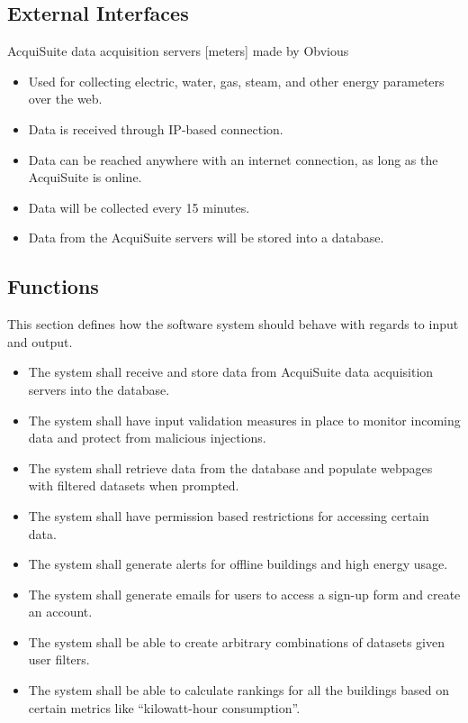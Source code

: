 \documentclass[onecolumn, draftclsnofoot,10pt, compsoc]{IEEEtran}
\begin{document}
    \subsection{External Interfaces}
    AcquiSuite data acquisition servers [meters] made by Obvious
    \begin{itemize}
        \item Used for collecting electric, water, gas, steam, and other energy parameters over the web.
        \item Data is received through IP-based connection.
        \item Data can be reached anywhere with an internet connection, as long as the AcquiSuite is online.
        \item Data will be collected every 15 minutes.
        \item Data from the AcquiSuite servers will be stored into a database.
    \end{itemize}

    \subsection{Functions}
    This section defines how the software system should behave with regards to input and output.
    \begin{itemize}
        \item The system shall receive and store data from AcquiSuite data acquisition servers into the database. 
        \item The system shall have input validation measures in place to monitor incoming data and protect from malicious injections.
        \item The system shall retrieve data from the database and populate webpages with filtered datasets when prompted.
        \item The system shall have permission based restrictions for accessing certain data.
        \item The system shall generate alerts for offline buildings and high energy usage.
        \item The system shall generate emails for users to access a sign-up form and create an account.
        \item The system shall be able to create arbitrary combinations of datasets given user filters.
        \item The system shall be able to calculate rankings for all the buildings based on certain metrics like ``kilowatt-hour consumption''.
    \end{itemize}
\end{document}
